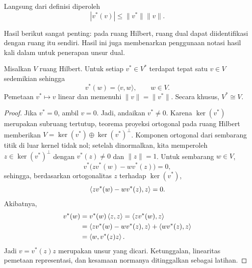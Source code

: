 Langsung dari definisi diperoleh
\begin{equation}
    |v^*(v)|\leq\|v^*\|\|v\|.
\end{equation}

Hasil berikut sangat penting: pada ruang Hilbert, ruang dual dapat
diidentifikasi dengan ruang itu sendiri. Hasil ini juga membenarkan penggunaan
notasi hasil kali dalam untuk penerapan unsur dual.

\begin{theorem}[Riesz]
    Misalkan $V$ ruang Hilbert. Untuk setiap $v^*\in V^*$ terdapat tepat satu
    $v\in V$ sedemikian sehingga
    \begin{equation}
        v^*(w)=\langle v,w\rangle,
        \qquad w\in V.
    \end{equation}
    Pemetaan $v^*\mapsto v$ linear dan memenuhi $\|v\|=\|v^*\|$. Secara
    khusus, $V^*\cong V$.
\end{theorem}

\begin{proof}
    Jika $v^*=0$, ambil $v=0$. Jadi, andaikan $v^*\neq0$. Karena
    $\ker(v^*)$ merupakan subruang tertutup, teorema proyeksi ortogonal pada
    ruang Hilbert memberikan
    $V=\ker(v^*)\oplus\ker(v^*)^\perp$. Komponen ortogonal dari sembarang titik
    di luar kernel tidak nol; setelah dinormalkan, kita memperoleh
    $z\in\ker(v^*)^\perp$ dengan $v^*(z)\neq0$ dan $\|z\|=1$.
    Untuk sembarang $w\in V$,
    \begin{equation}
        v^*\bigl(zv^*(w)-wv^*(z)\bigr)=0,
    \end{equation}
    sehingga, berdasarkan ortogonalitas $z$ terhadap $\ker(v^*)$,
    \begin{equation}
        \left\langle zv^*(w)-wv^*(z) , z\right\rangle=0.
    \end{equation}
    Akibatnya,
    \begin{equation}
        \begin{aligned}
            v^*(w)
            &=v^*(w)\left\langle z , z\right\rangle
              =\left\langle zv^*(w) , z\right\rangle\\
            &=\left\langle zv^*(w)-wv^*(z) , z\right\rangle
              +\left\langle wv^*(z) , z\right\rangle\\
            &=\left\langle w , v^*(z)z\right\rangle.
        \end{aligned}
    \end{equation}
    Jadi $v=v^*(z)z$ merupakan unsur yang dicari. Ketunggalan, linearitas
    pemetaan representasi, dan kesamaan normanya ditinggalkan sebagai latihan.
\end{proof}

